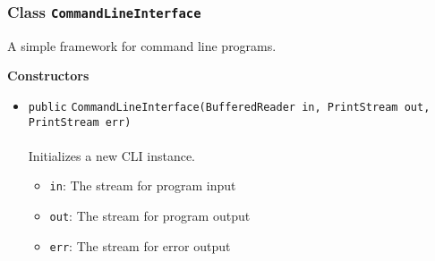 \subsubsection{Class \lstinline|CommandLineInterface|}
A simple framework for command line programs. \\
\noindent\begin{minipage}[t]{5cm}
\vspace{0.3em}
\hspace*{2em}
\vspace{0.3em}
\end{minipage}




\textbf{\sffamily Constructors}
\begin{itemize}
\item \lstinline|public| \lstinline|CommandLineInterface|\lstinline|(BufferedReader in, PrintStream out, PrintStream err)|\\ \\[-0.6em]
Initializes a new CLI instance.
\begin{itemize}
\item \lstinline|in|: The stream for program input
\item \lstinline|out|: The stream for program output
\item \lstinline|err|: The stream for error output
\end{itemize}



\end{itemize}


